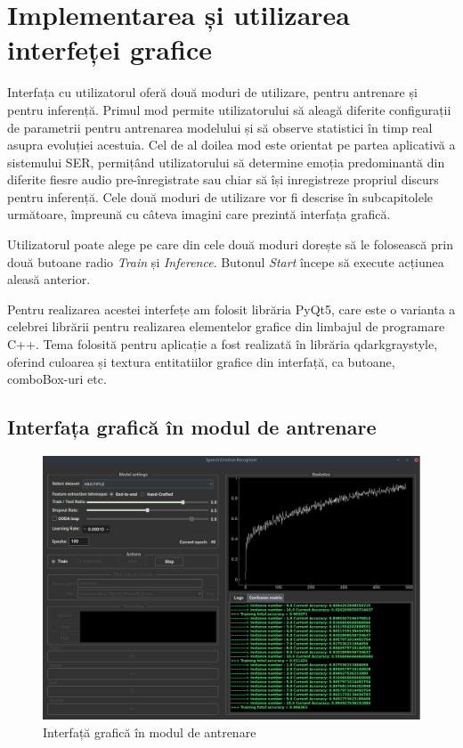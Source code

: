 \documentclass[a4paper,12pt]{book}
\begin{document}
	\section{Implementarea și utilizarea interfeței grafice}
		Interfața cu utilizatorul oferă două moduri de utilizare, pentru antrenare și pentru inferență. Primul mod permite utilizatorului să aleagă diferite configurații de parametrii pentru antrenarea modelului și să observe statistici în timp real asupra evoluției acestuia. Cel de al doilea mod este orientat pe partea aplicativă a sistemului SER, permițând utilizatorului să determine emoția predominantă din diferite fiesre audio pre-înregistrate sau chiar să își inregistreze propriul discurs pentru inferență. Cele două moduri de utilizare vor fi descrise în subcapitolele următoare, împreună cu câteva imagini care prezintă interfața grafică. \par 
		Utilizatorul poate alege pe care din cele două moduri dorește să le folosească prin două butoane radio \textit{Train} și \textit{Inference}. Butonul \textit{Start} începe să execute acțiunea aleasă anterior. \par
		
		Pentru realizarea acestei interfețe am folosit librăria PyQt5, care este o varianta a celebrei librării pentru realizarea elementelor grafice din limbajul de programare C++. Tema folosită pentru aplicație a fost realizată în librăria qdarkgraystyle, oferind culoarea și textura entitatiilor grafice din interfață, ca butoane, comboBox-uri etc. 
		
		\subsection{Interfața grafică în modul de antrenare} \label{guiAntrenare}
		
		\begin{figure}[h]					
			\hspace{0.75cm}
			\includegraphics[scale=0.45]{gui_training4}
			\caption{Interfață grafică în modul de antrenare}
			\label{fig:gui_train_1}
		\end{figure} 
		
\end{document}
